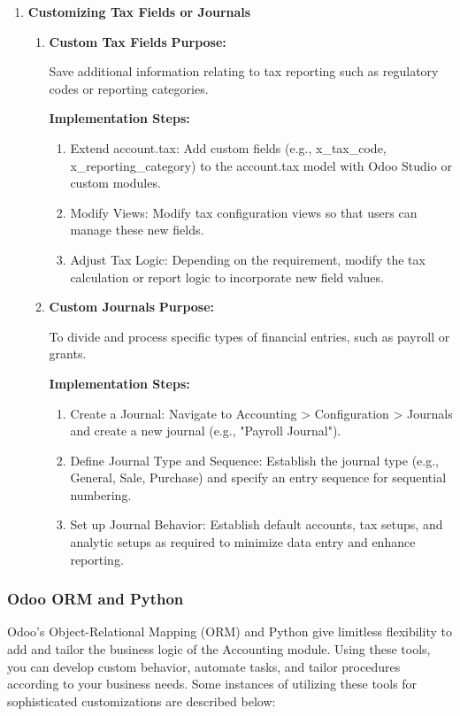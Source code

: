 \documentclass[11pt,a4paper]{article}
\begin{document}
\begin{enumerate}
    \item \textbf{Customizing Tax Fields or Journals}
    \begin{enumerate}
        \item \textbf{Custom Tax Fields}
        \medskip
        \textbf{Purpose:} 
        
        Save additional information relating to tax reporting such as regulatory codes or reporting 
        categories.
        \medskip

        \textbf{Implementation Steps:}
        \begin{enumerate}
            \item Extend account.tax: Add custom fields (e.g., x\_tax\_code, x\_reporting\_category) to the account.tax model with Odoo Studio or custom modules.
            \item Modify Views: Modify tax configuration views so that users can manage these new fields.
            \item Adjust Tax Logic: Depending on the requirement, modify the tax calculation or report logic to incorporate new field values.
        \end{enumerate}

        \item \textbf{Custom Journals}
        \medskip
        \textbf{Purpose:} 
        
        To divide and process specific types of financial entries, such as payroll or grants.
        \medskip

        \textbf{Implementation Steps:}
        \begin{enumerate}
            \item Create a Journal: Navigate to Accounting > Configuration > Journals and create a new journal (e.g., "Payroll Journal").
            \item Define Journal Type and Sequence: Establish the journal type (e.g., General, Sale, Purchase) and specify an entry sequence for sequential numbering.
            \item Set up Journal Behavior: Establish default accounts, tax setups, and analytic setups as required to minimize data entry and enhance reporting.
        \end{enumerate}

    \end{enumerate}

    \end{enumerate}

\subsubsection{Odoo ORM and Python}
Odoo's Object-Relational Mapping (ORM) and Python give limitless flexibility to add and tailor 
the business logic of the Accounting module. Using these tools, you can develop custom 
behavior, automate tasks, and tailor procedures according to your business needs. Some 
instances of utilizing these tools for sophisticated customizations are described below:
\medskip
\end{document}
